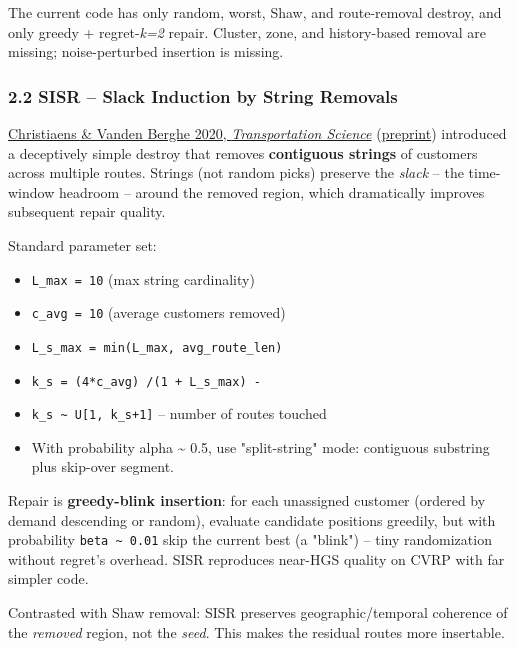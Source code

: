 \documentclass[twocolumn,10pt,letterpaper]{article}
\begin{document}
The current code has only random, worst, Shaw, and route-removal destroy, and only greedy + regret-\textit{k=2} repair. Cluster, zone, and history-based removal are missing; noise-perturbed insertion is missing.


\subsubsection{2.2 SISR -- Slack Induction by String Removals}

\href{https://pubsonline.informs.org/doi/10.1287/trsc.2019.0914}{Christiaens \& Vanden Berghe 2020, \textit{Transportation Science}} (\href{https://scispace.com/pdf/slack-induction-by-string-removals-for-vehicle-routing-14gqwirdlp.pdf}{preprint}) introduced a deceptively simple destroy that removes \textbf{contiguous strings} of customers across multiple routes. Strings (not random picks) preserve the \textit{slack} -- the time-window headroom -- around the removed region, which dramatically improves subsequent repair quality.


Standard parameter set:


\begin{itemize}
\setlength{\itemsep}{0pt}
\setlength{\parskip}{0pt}
  \item \texttt{L\_max = 10} (max string cardinality)
  \item \texttt{c\_avg = 10} (average customers removed)
  \item \texttt{L\_s\_max = min(L\_max, avg\_route\_len)}
  \item \texttt{k\_s = (4*c\_avg) /\allowbreak  (1 + L\_s\_max) -}
  \item \texttt{k\_s \textasciitilde{} U[1, k\_s+1]} -- number of routes touched
  \item With probability alpha \textasciitilde{} 0.5, use "split-string" mode: contiguous substring plus skip-over segment.
\end{itemize}

Repair is \textbf{greedy-blink insertion}: for each unassigned customer (ordered by demand descending or random), evaluate candidate positions greedily, but with probability \texttt{beta \textasciitilde{} 0.01} skip the current best (a "blink") -- tiny randomization without regret's overhead. SISR reproduces near-HGS quality on CVRP with far simpler code.


Contrasted with Shaw removal: SISR preserves geographic/temporal coherence of the \textit{removed} region, not the \textit{seed}. This makes the residual routes more insertable.
\end{document}
